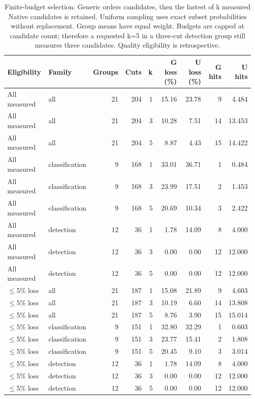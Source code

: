 \begin{table}[t]
\centering
\caption{Finite-budget selection: Generic orders candidates, then the fastest of k measured Native candidates is retained. Uniform sampling uses exact subset probabilities without replacement. Group means have equal weight. Budgets are capped at candidate count; therefore a requested k=5 in a three-cut detection group still measures three candidates. Quality eligibility is retrospective.}
\label{tab:budget-details}
\begingroup\small\setlength{\tabcolsep}{3pt}
\begin{tabular*}{\textwidth}{@{\extracolsep{\fill}}l l r r r r r r r@{}}
\toprule
Eligibility & Family & Groups & Cuts & k & G loss (\%) & U loss (\%) & G hits & U hits \\
\midrule
All measured & all & 21 & 204 & 1 & 15.16 & 23.78 & 9 & 4.484 \\
All measured & all & 21 & 204 & 3 & 10.28 & 7.51 & 14 & 13.453 \\
All measured & all & 21 & 204 & 5 & 8.87 & 4.43 & 15 & 14.422 \\
All measured & classification & 9 & 168 & 1 & 33.01 & 36.71 & 1 & 0.484 \\
All measured & classification & 9 & 168 & 3 & 23.99 & 17.51 & 2 & 1.453 \\
All measured & classification & 9 & 168 & 5 & 20.69 & 10.34 & 3 & 2.422 \\
All measured & detection & 12 & 36 & 1 & 1.78 & 14.09 & 8 & 4.000 \\
All measured & detection & 12 & 36 & 3 & 0.00 & 0.00 & 12 & 12.000 \\
All measured & detection & 12 & 36 & 5 & 0.00 & 0.00 & 12 & 12.000 \\
$\leq$5\% loss & all & 21 & 187 & 1 & 15.08 & 21.89 & 9 & 4.603 \\
$\leq$5\% loss & all & 21 & 187 & 3 & 10.19 & 6.60 & 14 & 13.808 \\
$\leq$5\% loss & all & 21 & 187 & 5 & 8.76 & 3.90 & 15 & 15.014 \\
$\leq$5\% loss & classification & 9 & 151 & 1 & 32.80 & 32.29 & 1 & 0.603 \\
$\leq$5\% loss & classification & 9 & 151 & 3 & 23.77 & 15.41 & 2 & 1.808 \\
$\leq$5\% loss & classification & 9 & 151 & 5 & 20.45 & 9.10 & 3 & 3.014 \\
$\leq$5\% loss & detection & 12 & 36 & 1 & 1.78 & 14.09 & 8 & 4.000 \\
$\leq$5\% loss & detection & 12 & 36 & 3 & 0.00 & 0.00 & 12 & 12.000 \\
$\leq$5\% loss & detection & 12 & 36 & 5 & 0.00 & 0.00 & 12 & 12.000 \\
\bottomrule
\end{tabular*}
\endgroup
\end{table}
